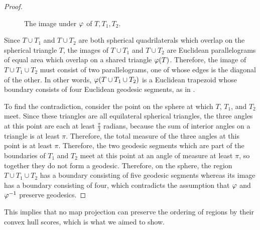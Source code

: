 \begin{proof}
		
\begin{figure}[h]
	\centering
	
	\caption{The image under $\varphi$ of $T,T_1,T_2$.}
	\label{fig:sphtris_pl}
\end{figure}

Since $T\cup T_1$ and $T\cup T_2$ are both spherical quadrilaterals which overlap on the spherical triangle $T$, the images of $T\cup T_1$ and $T\cup T_2$ are Euclidean parallelograms of equal area which overlap on a shared triangle $\varphi(T)$.
	Therefore, the image of $T\cup T_1\cup T_2$ must 
	consist of two parallelograms, one of whose 
	edges is the diagonal of the other. In other words, 
	$\varphi(T\cup T_1\cup T_2)$ is a Euclidean trapezoid 
	whose boundary consists of four Euclidean geodesic 
	segments, as in .
	
	To find the contradiction, consider the point on the sphere at which $T$, $T_1$, and $T_2$ meet.  Since these triangles are all equilateral spherical triangles, the three angles at this point are each at least $\tfrac{\pi}{3}$ radians, because the sum of interior angles on a triangle is at least $\pi$.  Therefore, the total measure of the three angles at this point is at least $\pi$.  Therefore, the two geodesic segments which are part of the boundaries of $T_1$ and $T_2$ meet at this point at an angle of measure at least $\pi$, so together they do not form a geodesic.  Therefore, on the sphere, the region $T\cup T_1\cup T_2$ has a boundary consisting of five geodesic segments whereas its image has a boundary consisting of four, which contradicts the assumption that $\varphi$ and $\varphi^{-1}$ preserve geodesics.
\end{proof}

This implies that no map projection can preserve the ordering of regions by their convex hull scores, which is what we aimed to show.

